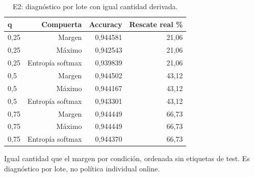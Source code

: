 \begin{table}[!htbp]\centering
\fontsize{8}{10}\selectfont\setlength{\tabcolsep}{4pt}
\caption{E2: diagnóstico por lote con igual cantidad derivada.}\label{tab:e2-matched}
\begin{tabular}{@{}lrrr@{}}\toprule
q & Compuerta & Accuracy & Rescate real \%\\\midrule
0,25 & Margen & 0,944581 & 21,06\\
0,25 & Máximo & 0,942543 & 21,06\\
0,25 & Entropía softmax & 0,939839 & 21,06\\
0,5 & Margen & 0,944502 & 43,12\\
0,5 & Máximo & 0,944167 & 43,12\\
0,5 & Entropía softmax & 0,943301 & 43,12\\
0,75 & Margen & 0,944449 & 66,73\\
0,75 & Máximo & 0,944449 & 66,73\\
0,75 & Entropía softmax & 0,944370 & 66,73\\
\bottomrule\end{tabular}
\par\smallskip\begin{minipage}{0.98\textwidth}\footnotesize Igual cantidad que el margen por condición, ordenada sin etiquetas de test. Es diagnóstico por lote, no política individual online.\end{minipage}
\end{table}
